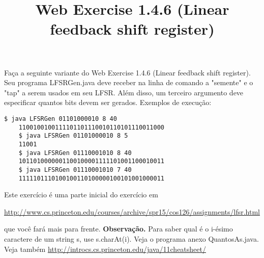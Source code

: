 \documentclass{article}
\title{Web Exercise 1.4.6 (Linear feedback shift register)}
\date{}
\author{}
\begin{document}
\maketitle

Fa\c{c}a a seguinte variante do Web Exercise 1.4.6 (Linear feedback shift register). Seu programa LFSRGen.java deve receber na linha de comando a "semente" e o "tap" a serem usados em seu LFSR. Al\'em disso, um terceiro argumento deve especificar quantos bits devem ser gerados. Exemplos de execu\c{c}\~ao:
\bigbreak
\begin{lstlisting}[breaklines, gobble=8]
	$ java LFSRGen 01101000010 8 40
	1100100100111101101110010110101110011000
	$ java LFSRGen 01101000010 8 5
	11001
	$ java LFSRGen 01110001010 8 40
	1011010000001100100001111101001100010011
	$ java LFSRGen 01110001010 7 40
	1111101110100100110100000100101001000011
\end{lstlisting}
\bigbreak
Este exercício \'e uma parte inicial do exerc\'icio em

\url{http://www.cs.princeton.edu/courses/archive/spr15/cos126/assignments/lfsr.html}

que você far\'a mais para frente.
\bigbreak
\textbf{Observa\c{c}ão.} Para saber qual \'e o i-\'esimo caractere de um string s, use s.charAt(i). Veja o programa anexo QuantosAs.java.
\bigbreak
Veja tamb\'em \url{http://introcs.cs.princeton.edu/java/11cheatsheet/}
\end{document}
